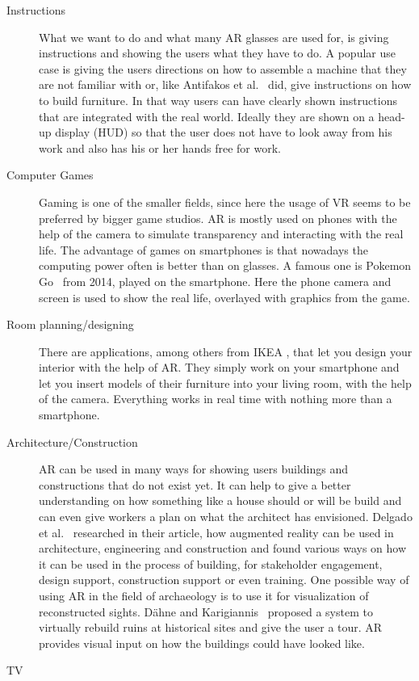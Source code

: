 \begin{description}
	\item[Instructions]
	What we want to do and what many AR glasses are used for, is giving instructions and showing the users what they have to do. A popular use case is giving the users directions on how to assemble a machine that they are not familiar with or, like Antifakos et al.~\cite{antifakos02} did, give instructions on how to build furniture. In that way users can have clearly shown instructions that are integrated with the real world. Ideally they are shown on a head-up display (HUD) so that the user does not have to look away from his work and also has his or her hands free for work.
	\newpage
	\item[Computer Games]
	Gaming is one of the smaller fields, since here the usage of VR seems to be preferred by bigger game studios. AR is mostly used on phones with the help of the camera to simulate transparency and interacting with the real life. The advantage of games on smartphones is that nowadays the computing power often is better than on glasses. A famous one is Pokemon Go~\cite{pokemongo} from 2014, played on the smartphone. Here the phone camera and screen is used to show the real life, overlayed with graphics from the game. 
	\item[Room planning/designing]
	There are applications, among others from IKEA \cite{ikea17}, that let you design your interior with the help of AR. They simply work on your smartphone and let you insert models of their furniture into your living room, with the help of the camera. Everything works in real time with nothing more than a smartphone. 
	\item[Architecture/Construction]
	AR can be used in many ways for showing users buildings and constructions that do not exist yet. It can help to give a better understanding on how something like a house should or will be build and can even give workers a plan on what the architect has envisioned. Delgado et al.~\cite{delgado20} researched in their article, how augmented reality can be used in architecture, engineering and construction and found various ways on how it can be used in the process of building, for stakeholder engagement, design support, construction support or even training.
	One possible way of using AR in the field of archaeology is to use it for visualization of reconstructed sights. Dähne and Karigiannis~\cite{daehne02} proposed a system to virtually rebuild ruins at historical sites and give the user a tour. AR provides visual input on how the buildings could have looked like. 
	\item[TV]

\end{description}
